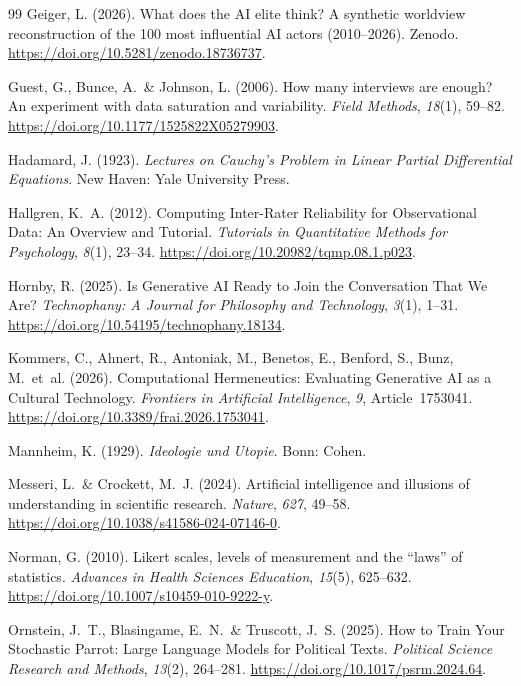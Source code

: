\documentclass[11pt,a4paper]{article}
\begin{document}
\begin{thebibliography}{99}
  Geiger, L. (2026).
  What does the AI elite think? A synthetic worldview reconstruction of the 100 most influential AI actors (2010--2026).
  Zenodo. \url{https://doi.org/10.5281/zenodo.18736737}.

  Guest, G., Bunce, A.~\& Johnson, L. (2006).
  How many interviews are enough? An experiment with data saturation and variability.
  \textit{Field Methods}, \textit{18}(1), 59--82. \url{https://doi.org/10.1177/1525822X05279903}.

  Hadamard, J. (1923).
  \textit{Lectures on Cauchy's Problem in Linear Partial Differential Equations}.
  New Haven: Yale University Press.

  Hallgren, K.~A. (2012).
  Computing Inter-Rater Reliability for Observational Data: An Overview and Tutorial.
  \textit{Tutorials in Quantitative Methods for Psychology}, \textit{8}(1), 23--34. \url{https://doi.org/10.20982/tqmp.08.1.p023}.

  Hornby, R. (2025).
  Is Generative AI Ready to Join the Conversation That We Are?
  \textit{Technophany: A Journal for Philosophy and Technology}, \textit{3}(1), 1--31. \url{https://doi.org/10.54195/technophany.18134}.

  Kommers, C., Ahnert, R., Antoniak, M., Benetos, E., Benford, S., Bunz, M.~et~al. (2026).
  Computational Hermeneutics: Evaluating Generative AI as a Cultural Technology.
  \textit{Frontiers in Artificial Intelligence}, \textit{9}, Article~1753041. \url{https://doi.org/10.3389/frai.2026.1753041}.

  Mannheim, K. (1929).
  \textit{Ideologie und Utopie}.
  Bonn: Cohen.

  Messeri, L.~\& Crockett, M.~J. (2024).
  Artificial intelligence and illusions of understanding in scientific research.
  \textit{Nature}, \textit{627}, 49--58. \url{https://doi.org/10.1038/s41586-024-07146-0}.

  Norman, G. (2010).
  Likert scales, levels of measurement and the ``laws'' of statistics.
  \textit{Advances in Health Sciences Education}, \textit{15}(5), 625--632. \url{https://doi.org/10.1007/s10459-010-9222-y}.

  Ornstein, J.~T., Blasingame, E.~N.~\& Truscott, J.~S. (2025).
  How to Train Your Stochastic Parrot: Large Language Models for Political Texts.
  \textit{Political Science Research and Methods}, \textit{13}(2), 264--281. \url{https://doi.org/10.1017/psrm.2024.64}.


\end{thebibliography}
\end{document}

